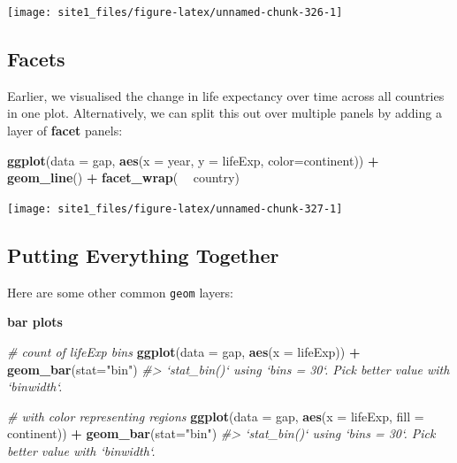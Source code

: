 \documentclass[]{book}
\newenvironment{Shaded}{\begin{snugshade}}{\end{snugshade}}
\newcommand{\KeywordTok}[1]{\textcolor[rgb]{0.13,0.29,0.53}{\textbf{#1}}}
\newcommand{\DataTypeTok}[1]{\textcolor[rgb]{0.13,0.29,0.53}{#1}}
\newcommand{\StringTok}[1]{\textcolor[rgb]{0.31,0.60,0.02}{#1}}
\newcommand{\CommentTok}[1]{\textcolor[rgb]{0.56,0.35,0.01}{\textit{#1}}}
\newcommand{\OperatorTok}[1]{\textcolor[rgb]{0.81,0.36,0.00}{\textbf{#1}}}
\newcommand{\NormalTok}[1]{#1}
\begin{document}
\begin{center}\texttt{[image: site1\_files/figure-latex/unnamed-chunk-326-1]} \end{center}

\subsection{Facets}\label{facets}

Earlier, we visualised the change in life expectancy over time across
all countries in one plot. Alternatively, we can split this out over
multiple panels by adding a layer of \textbf{facet} panels:

\begin{Shaded}
\begin{Highlighting}[]
\KeywordTok{ggplot}\NormalTok{(}\DataTypeTok{data =}\NormalTok{ gap, }\KeywordTok{aes}\NormalTok{(}\DataTypeTok{x =}\NormalTok{ year, }\DataTypeTok{y =}\NormalTok{ lifeExp, }\DataTypeTok{color=}\NormalTok{continent)) }\OperatorTok{+}
\StringTok{  }\KeywordTok{geom_line}\NormalTok{() }\OperatorTok{+}\StringTok{ }
\StringTok{  }\KeywordTok{facet_wrap}\NormalTok{( }\OperatorTok{~}\StringTok{ }\NormalTok{country)}
\end{Highlighting}
\end{Shaded}

\begin{center}\texttt{[image: site1\_files/figure-latex/unnamed-chunk-327-1]} \end{center}

\subsection{Putting Everything
Together}\label{putting-everything-together}

Here are some other common \texttt{geom} layers:

\textbf{bar plots}

\begin{Shaded}
\begin{Highlighting}[]
\CommentTok{# count of lifeExp bins}
\KeywordTok{ggplot}\NormalTok{(}\DataTypeTok{data =}\NormalTok{ gap, }\KeywordTok{aes}\NormalTok{(}\DataTypeTok{x =}\NormalTok{ lifeExp)) }\OperatorTok{+}\StringTok{ }
\StringTok{  }\KeywordTok{geom_bar}\NormalTok{(}\DataTypeTok{stat=}\StringTok{"bin"}\NormalTok{)}
\CommentTok{#> `stat_bin()` using `bins = 30`. Pick better value with `binwidth`.}

\CommentTok{# with color representing regions}
\KeywordTok{ggplot}\NormalTok{(}\DataTypeTok{data =}\NormalTok{ gap, }\KeywordTok{aes}\NormalTok{(}\DataTypeTok{x =}\NormalTok{ lifeExp, }\DataTypeTok{fill =}\NormalTok{ continent)) }\OperatorTok{+}\StringTok{ }
\StringTok{  }\KeywordTok{geom_bar}\NormalTok{(}\DataTypeTok{stat=}\StringTok{"bin"}\NormalTok{)}
\CommentTok{#> `stat_bin()` using `bins = 30`. Pick better value with `binwidth`.}
\end{Highlighting}
\end{Shaded}
\end{document}
